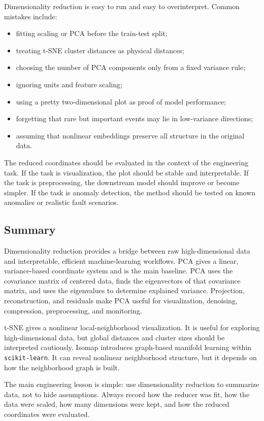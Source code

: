 \documentclass[12pt,letter]{article}
\begin{document}
Dimensionality reduction is easy to run and easy to overinterpret. Common mistakes include:

\begin{itemize}
    \item fitting scaling or PCA before the train-test split;
    \item treating t-SNE cluster distances as physical distances;
    \item choosing the number of PCA components only from a fixed variance rule;
    \item ignoring units and feature scaling;
    \item using a pretty two-dimensional plot as proof of model performance;
    \item forgetting that rare but important events may lie in low-variance directions;
    \item assuming that nonlinear embeddings preserve all structure in the original data.
\end{itemize}

The reduced coordinates should be evaluated in the context of the engineering task. If the task is visualization, the plot should be stable and interpretable. If the task is preprocessing, the downstream model should improve or become simpler. If the task is anomaly detection, the method should be tested on known anomalies or realistic fault scenarios.

\subsection{Summary}

Dimensionality reduction provides a bridge between raw high-dimensional data and interpretable, efficient machine-learning workflows. PCA gives a linear, variance-based coordinate system and is the main baseline. PCA uses the covariance matrix of centered data, finds the eigenvectors of that covariance matrix, and uses the eigenvalues to determine explained variance. Projection, reconstruction, and residuals make PCA useful for visualization, denoising, compression, preprocessing, and monitoring.

t-SNE gives a nonlinear local-neighborhood visualization. It is useful for exploring high-dimensional data, but global distances and cluster sizes should be interpreted cautiously. Isomap introduces graph-based manifold learning within \texttt{scikit-learn}. It can reveal nonlinear neighborhood structure, but it depends on how the neighborhood graph is built.

The main engineering lesson is simple: use dimensionality reduction to summarize data, not to hide assumptions. Always record how the reducer was fit, how the data were scaled, how many dimensions were kept, and how the reduced coordinates were evaluated.
\end{document}
